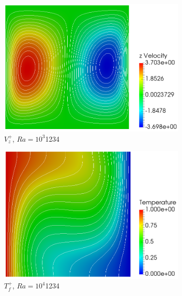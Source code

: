 \begin{figure}[!h]
\begin{subfigure}{0.32\textwidth}
  \includegraphics[width=\linewidth]{figs/Ra3_v.png}
  \caption{\(V_z^+\), \(Ra=10^3\)\color{white}1234}
  \vspace*{0.5em}
\end{subfigure}
\begin{subfigure}{0.32\textwidth}
  \centering
  \includegraphics[width=\linewidth]{figs/Ra4_t.png}
  \caption{\(T_f^+\), \(Ra=10^4\)\color{white}1234}
    \vspace*{0.5em}
\end{subfigure}
\begin{subfigure}{0.32\textwidth}
  \centering

\end{subfigure}
\end{figure}
